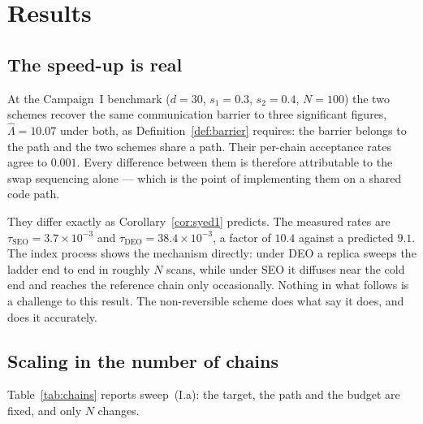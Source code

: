\section{Results}
\label{sec:results}

\subsection{The speed-up is real}
\label{sec:results-speedup}

At the Campaign~I benchmark ($d=30$, $s_1=0.3$, $s_2=0.4$, $N=100$) the two
schemes recover the same communication barrier to three significant figures,
$\hat\Lambda=10.07$ under both, as Definition~\ref{def:barrier} requires: the
barrier belongs to the path and the two schemes share a path. Their per-chain
acceptance rates agree to $0.001$. Every difference between them is therefore
attributable to the swap sequencing alone --- which is the point of implementing
them on a shared code path.

They differ exactly as Corollary~\ref{cor:syed1} predicts. The measured rates are
$\tau_{\mathrm{SEO}}=3.7\times10^{-3}$ and
$\tau_{\mathrm{DEO}}=38.4\times10^{-3}$, a factor of $10.4$ against a predicted
$9.1$. The index process shows the mechanism directly: under DEO a replica sweeps
the ladder end to end in roughly $N$ scans, while under SEO it diffuses near the
cold end and reaches the reference chain only occasionally. Nothing in what
follows is a challenge to this result. The non-reversible scheme does what
\citet{syed2022} say it does, and does it accurately.

\subsection{Scaling in the number of chains}
\label{sec:results-chains}

Table~\ref{tab:chains} reports sweep~(I.a): the target, the path and the budget
are fixed, and only $N$ changes.

